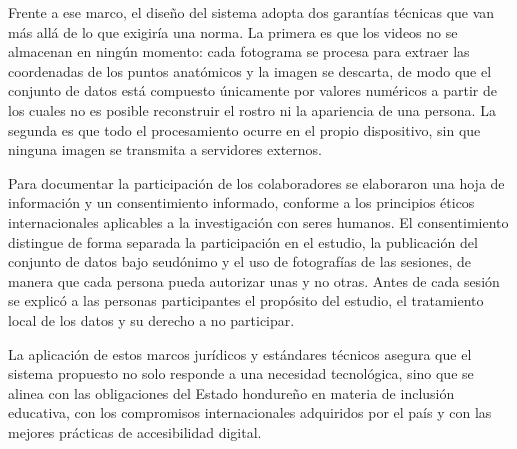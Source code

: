 Frente a ese marco, el diseño del sistema adopta dos garantías técnicas que van más allá
de lo que exigiría una norma. La primera es que los videos no se almacenan en ningún
momento: cada fotograma se procesa para extraer las coordenadas de los puntos anatómicos y
la imagen se descarta, de modo que el conjunto de datos está compuesto únicamente por
valores numéricos a partir de los cuales no es posible reconstruir el rostro ni la
apariencia de una persona. La segunda es que todo el procesamiento ocurre en el propio
dispositivo, sin que ninguna imagen se transmita a servidores externos.

Para documentar la participación de los colaboradores se elaboraron una hoja de
información y un consentimiento informado, conforme a los principios éticos
internacionales aplicables a la investigación con seres humanos. El consentimiento
distingue de forma separada la participación en el estudio, la publicación del conjunto
de datos bajo seudónimo y el uso de fotografías de las sesiones, de manera que cada
persona pueda autorizar unas y no otras. Antes de cada sesión se explicó a las personas
participantes el propósito del estudio, el tratamiento local de los datos y su derecho a
no participar.

La aplicación de estos marcos jurídicos y estándares técnicos asegura que el sistema
propuesto no solo responde a una necesidad tecnológica, sino que se alinea con las
obligaciones del Estado hondureño en materia de inclusión educativa, con los compromisos
internacionales adquiridos por el país y con las mejores prácticas de accesibilidad
digital.
